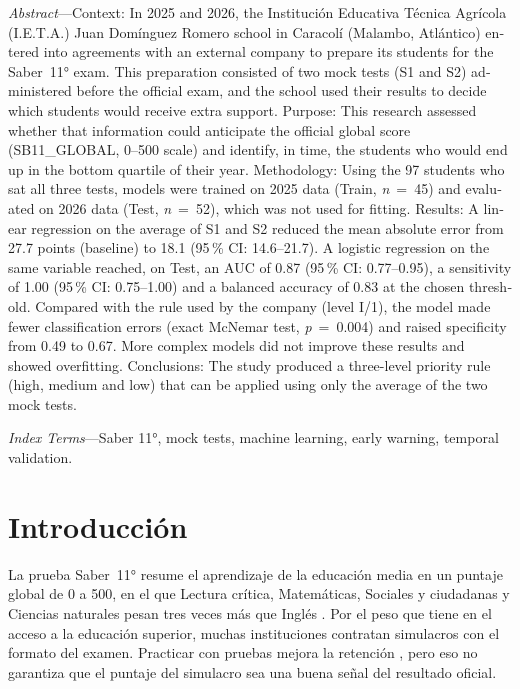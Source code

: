 \documentclass[10pt,letterpaper,twocolumn]{article}
\newcommand{\parencite}{\citep}
\begin{document}
{\begin{otherlanguage}{english}
	\textit{Abstract}---Context: In 2025 and 2026, the Institución Educativa Técnica Agrícola (I.E.T.A.) Juan Domínguez Romero school in Caracolí (Malambo, Atlántico) entered into agreements with an external company to prepare its students for the Saber~11° exam. This preparation consisted of two mock tests (S1 and S2) administered before the official exam, and the school used their results to decide which students would receive extra support. Purpose: This research assessed whether that information could anticipate the official global score (SB11\_GLOBAL, 0--500 scale) and identify, in time, the students who would end up in the bottom quartile of their year. Methodology: Using the 97 students who sat all three tests, models were trained on 2025 data (Train, \textit{n}~=~45) and evaluated on 2026 data (Test, \textit{n}~=~52), which was not used for fitting. Results: A linear regression on the average of S1 and S2 reduced the mean absolute error from 27.7 points (baseline) to 18.1 (95\,\% CI: 14.6--21.7). A logistic regression on the same variable reached, on Test, an AUC of 0.87 (95\,\% CI: 0.77--0.95), a sensitivity of 1.00 (95\,\% CI: 0.75--1.00) and a balanced accuracy of 0.83 at the chosen threshold. Compared with the rule used by the company (level I/1), the model made fewer classification errors (exact McNemar test, \textit{p}~=~0.004) and raised specificity from 0.49 to 0.67. More complex models did not improve these results and showed overfitting. Conclusions: The study produced a three-level priority rule (high, medium and low) that can be applied using only the average of the two mock tests.
	
	\textit{Index Terms}---Saber 11°, mock tests, machine learning, early warning, temporal validation.
\end{otherlanguage}
\par}

\section{Introducción}

La prueba Saber~11° resume el aprendizaje de la educación media en un puntaje global de 0 a 500, en el que Lectura crítica, Matemáticas, Sociales y ciudadanas y Ciencias naturales pesan tres veces más que Inglés \parencite{icfes2026saber11}. Por el peso que tiene en el acceso a la educación superior, muchas instituciones contratan simulacros con el formato del examen. Practicar con pruebas mejora la retención \parencite{roediger2006test}, pero eso no garantiza que el puntaje del simulacro sea una buena señal del resultado oficial.
\end{document}
